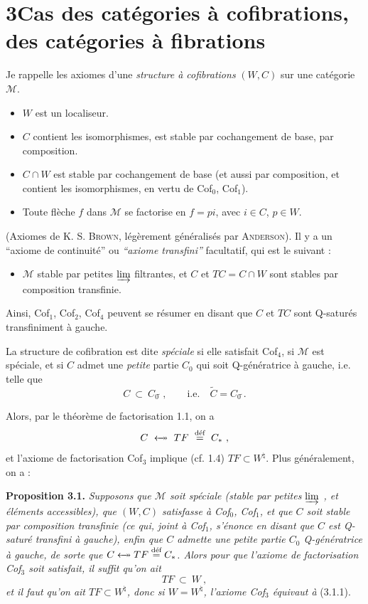 \documentclass[11pt]{article}
\newcommand{\printedpage}[1]{\marginpar{\footnotesize p.~#1}}
\newcommand{\msp}[1]{\marginpar{\footnotesize [#1]}}
\newcommand{\M}{\mathcal{M}}
\newcommand{\deq}{\overset{\text{déf}}{=}}
\newcommand{\Qs}{\tilde{\ }}
\newcommand{\fact}{\mathrel{\leftarrow\mkern-11mu\twoheadrightarrow}}
\begin{document}
\msp{page 33}

\section*{3\quad Cas des catégories à cofibrations, des catégories à fibrations}

Je rappelle les axiomes d'une \textit{structure à cofibrations} $(W,C)$ sur une catégorie $\M$.

\begin{itemize}[leftmargin=4em,labelwidth=3.5em,align=left]
\item[Cof$_0$ :] $W$ est un localiseur.
\item[Cof$_1$ :] $C$ contient les isomorphismes, est stable par cochangement de base, par composition.
\item[Cof$_2$ :] $C\cap W$ est stable par cochangement de base (et aussi par composition, et contient les isomorphismes, en vertu de Cof$_0$, Cof$_1$).
\item[Cof$_3$ :] Toute flèche $f$ dans $\M$ se factorise en $f=pi$, avec $i\in C$, $p\in W$.
\end{itemize}

(Axiomes de K. S. \textsc{Brown}, légèrement généralisés par \textsc{Anderson}). Il y a un ``axiome
\printedpage{20}
de continuité'' ou \textit{``axiome transfini''} facultatif, qui est le suivant :

\begin{itemize}[leftmargin=4em,labelwidth=3.5em,align=left]
\item[Cof$_4$ :] $\M$ stable par petites $\varinjlim$ filtrantes, et $C$ et $TC = C\cap W$ sont stables par composition transfinie.
\end{itemize}

Ainsi, Cof$_1$, Cof$_2$, Cof$_4$ peuvent se résumer en disant que $C$ et $TC$ sont Q-saturés transfiniment à gauche.

La structure de cofibration est dite \textit{spéciale} si elle satisfait Cof$_4$, si $\M$ est spéciale, et si $C$ admet une \textit{petite} partie $C_0$ qui soit Q-génératrice à gauche, i.e. telle que
\[
C \ \subset\ C_0\Qs\,, \qquad \text{i.e.}\quad \tilde{C}=C_0\Qs. \tag*{(3.1)}
\]

\msp{page 34}
Alors, par le théorème de factorisation 1.1, on a
\[
C \ \fact\ TF \ \deq\ C_* \ ,
\]
et l'axiome de factorisation Cof$_3$ implique (cf. 1.4) $TF\subset W^{\natural}$. Plus généralement, on a :

\textbf{Proposition 3.1.} \textit{Supposons que $\M$ soit spéciale (stable par petites $\varinjlim$ , et éléments accessibles), que $(W,C)$ satisfasse à Cof$_0$, Cof$_1$, et que $C$ soit stable par composition transfinie (ce qui, joint à Cof$_1$, s'énonce en disant que $C$ est Q-saturé transfini à gauche), enfin que $C$ admette une petite partie $C_0$ Q-génératrice à gauche, de sorte que $C\fact TF\deq C_*$. Alors pour que l'axiome de factorisation Cof$_3$ soit satisfait, il suffit qu'on ait}
\[
TF \ \subset\ W \ , \tag*{(3.1.1)}
\]
\textit{et il faut qu'on ait $TF\subset W^{\natural}$, donc si $W=W^{\natural}$, l'axiome Cof$_3$ équivaut à} (3.1.1).
\end{document}
